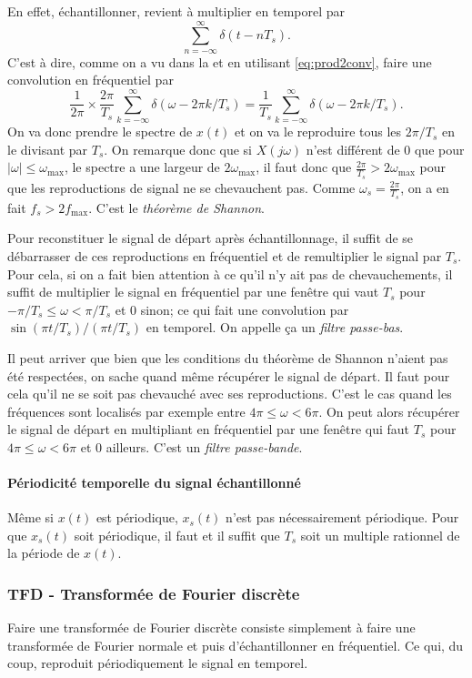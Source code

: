 En effet, échantillonner,
revient à multiplier en temporel par
\[ \sum_{n=-\infty}^{\infty} \delta(t-nT_s). \]
C'est à dire, comme on a vu dans la  et
en utilisant \eqref{eq:prod2conv},
faire une convolution en fréquentiel par
\[ \frac{1}{2\pi} \times
\frac{2\pi}{T_s}\sum_{k=-\infty}^\infty\delta(\omega-2\pi k/T_s)
= \frac{1}{T_s}\sum_{k=-\infty}^\infty\delta(\omega-2\pi k/T_s). \]
On va donc prendre le spectre de $x(t)$ et on va le reproduire tous les
$2\pi/T_s$ en le divisant par $T_s$.
On remarque donc que si $X(j\omega)$ n'est différent de 0 que pour
$|\omega| \leq \omega_\mathrm{max}$,
le spectre a une largeur de $2\omega_\mathrm{max}$,
il faut donc que $\frac{2\pi}{T_s} > 2\omega_\mathrm{max}$ pour que les
reproductions de signal ne se chevauchent pas.
Comme $\omega_s = \frac{2\pi}{T_s}$, on a en fait $f_s > 2f_\mathrm{max}$.
C'est le \emph{théorème de Shannon}.

Pour reconstituer le signal de départ après échantillonnage,
il suffit de se débarrasser de ces reproductions en fréquentiel
et de remultiplier le signal par $T_s$.
Pour cela, si on a fait bien attention à
ce qu'il n'y ait pas de chevauchements,
il suffit de multiplier le signal en fréquentiel par une fenêtre
qui vaut $T_s$ pour $-\pi/T_s \leq \omega < \pi/T_s$ et 0 sinon;
ce qui fait une convolution par $\sin(\pi t/T_s)/(\pi t/T_s)$ en temporel.
On appelle ça un \emph{filtre passe-bas}.

Il peut arriver que bien que les conditions du théorème de Shannon n'aient
pas été respectées, on sache quand même récupérer le signal de départ.
Il faut pour cela qu'il ne se soit pas chevauché avec ses reproductions.
C'est le cas quand les fréquences sont localisés par exemple entre
$4\pi \leq \omega < 6\pi$.
On peut alors récupérer le signal de départ en multipliant
en fréquentiel par une fenêtre qui faut $T_s$ pour
$4\pi \leq \omega < 6\pi$ et 0 ailleurs.
C'est un \emph{filtre passe-bande}.

\paragraph{Périodicité temporelle du signal échantillonné}
Même si $x(t)$ est périodique,
$x_s(t)$ n'est pas nécessairement périodique.
Pour que $x_s(t)$ soit périodique, il faut et il suffit que
$T_s$ soit un multiple rationnel de la période de $x(t)$.

\subsubsection{TFD - Transformée de Fourier discrète}
Faire une transformée de Fourier discrète consiste simplement à faire une
transformée de Fourier normale et puis d'échantillonner en fréquentiel.
Ce qui, du coup, reproduit périodiquement le signal en temporel.

